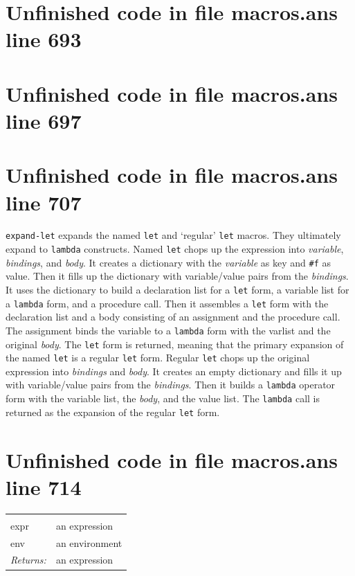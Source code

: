 \documentclass[twoside,9pt]{report}
\begin{document}
\section{Unfinished code in file macros.ans line 693}

\section{Unfinished code in file macros.ans line 697}
\section{Unfinished code in file macros.ans line 707}

\texttt{expand-let} expands the named \texttt{let} and `regular' \texttt{let} macros. They ultimately expand to \texttt{lambda} constructs. Named \texttt{let} chops up the expression into \emph{variable}, \emph{bindings}, and \emph{body}. It creates a dictionary with the \emph{variable} as key and \texttt{\#f} as value. Then it fills up the dictionary with variable/value pairs from the \emph{bindings}. It uses the dictionary to build a declaration list for a \texttt{let} form, a variable list for a \texttt{lambda} form, and a procedure call. Then it assembles a \texttt{let} form with the declaration list and a body consisting of an assignment and the procedure call. The assignment binds the variable to a \texttt{lambda} form with the varlist and the original \emph{body}. The \texttt{let} form is returned, meaning that the primary expansion of the named \texttt{let} is a regular \texttt{let} form. Regular \texttt{let} chops up the original expression into \emph{bindings} and \emph{body}. It creates an empty dictionary and fills it up with variable/value pairs from the \emph{bindings}. Then it builds a \texttt{lambda} operator form with the variable list, the \emph{body}, and the value list. The \texttt{lambda} call is returned as the expansion of the regular \texttt{let} form.

\section{Unfinished code in file macros.ans line 714}
\noindent\begin{tabular}{ |p{1.9cm} p{8cm}| }
\hline
\rowcolor[HTML]{CCCCCC} \multicolumn{2}{|l|}{\bf expand-let (internal)} \\
expr & an expression \\
env & an environment \\
\textit{Returns:} & an expression \\
\hline
\end{tabular}
\end{document}
